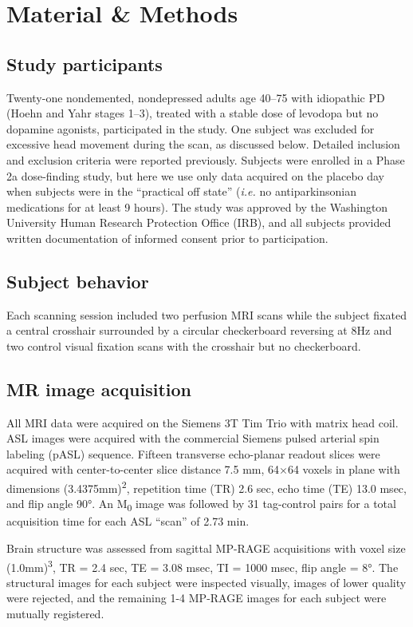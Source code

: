 \section{Material \& Methods}

\subsection{Study participants}
Twenty-one nondemented, nondepressed adults age 40–75 with idiopathic PD (Hoehn and Yahr stages 1–3),\cite{6067254} treated with a stable dose of levodopa but no dopamine agonists, participated in the study. One subject was excluded for excessive head movement during the scan, as discussed below. Detailed inclusion and exclusion criteria were reported previously.\cite{SYN115_2010_AAN_RCT} Subjects were enrolled in a Phase 2a dose-finding study,\cite{Black_2010} but here we use only data acquired on the placebo day when subjects were in the ``practical off state'' (\textit{i.e.} no antiparkinsonian medications for at least 9 hours). The study was approved by the Washington University Human Research Protection Office (IRB), and all subjects provided written documentation of informed consent prior to participation.

\subsection{Subject behavior}
Each scanning session included two perfusion MRI scans while the subject fixated a central crosshair surrounded by a circular checkerboard reversing at 8Hz and two control visual fixation scans with the crosshair but no checkerboard. 

\subsection{MR image acquisition}
All MRI data were acquired on the Siemens 3T Tim Trio with matrix head coil. ASL images were acquired with the commercial Siemens pulsed arterial spin labeling (pASL) sequence.\cite{Wang_2003} Fifteen transverse echo-planar readout slices were acquired with center-to-center slice distance 7.5 mm, 64$\times$64 voxels in plane with dimensions (3.4375mm)\textsuperscript{2}, repetition time (TR) 2.6 sec, echo time (TE) 13.0 msec, and flip angle 90°. An M\textsubscript{0} image was followed by 31 tag-control pairs for a total acquisition time for each ASL ``scan'' of 2.73 min.

Brain structure was assessed from sagittal MP-RAGE acquisitions with voxel size (1.0mm)\textsuperscript{3}, TR = 2.4 sec, TE = 3.08 msec, TI = 1000 msec, flip angle = 8°. The structural images for each subject were inspected visually, images of lower quality were rejected, and the remaining 1-4 MP-RAGE images for each subject were mutually registered.

